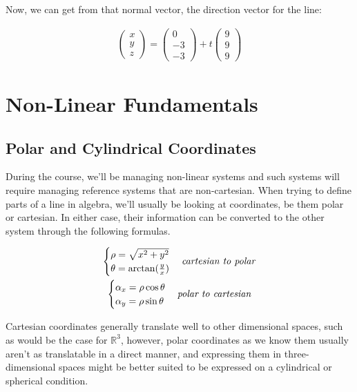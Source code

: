 \documentclass[11pt,fleqn]{book} %
\begin{document}
Now, we can get from that normal vector, the direction vector for the line:

\begin{gather}
    \begin{pmatrix}
        x\\y\\z
    \end{pmatrix} = 
    \begin{pmatrix}
        0\\-3\\-3
    \end{pmatrix} + t\begin{pmatrix}
        9\\9\\9
    \end{pmatrix}
\end{gather}


\chapter{Non-Linear Fundamentals}
\section{Polar and Cylindrical Coordinates}

During the course, we'll be managing non-linear systems and such 
systems will require managing reference systems that are non-cartesian.
When trying to define parts of a line in algebra, we'll usually be looking at
coordinates, be them polar or cartesian. In either case, their information can be 
converted to the other system through the following formulas.

\begin{gather}
    \begin{cases}
        \rho = \sqrt{x^2+y^2} \\
        \theta = \arctan(\frac{y}{x})
    \end{cases}
    \text{\textit{cartesian to polar}}\\
    \begin{cases}
        \alpha_x = \rho \cos \theta \\
        \alpha_y = \rho \sin \theta
    \end{cases}
    \text{\textit{polar to cartesian}}
\end{gather}

Cartesian coordinates generally translate well to other dimensional spaces, such as would be the case
for $ \mathbb{R}^3 $, however, polar coordinates as we know them usually aren't as translatable in a direct
manner, and expressing them in three-dimensional spaces might be better suited to 
be expressed on a cylindrical or spherical condition. 
\end{document}
